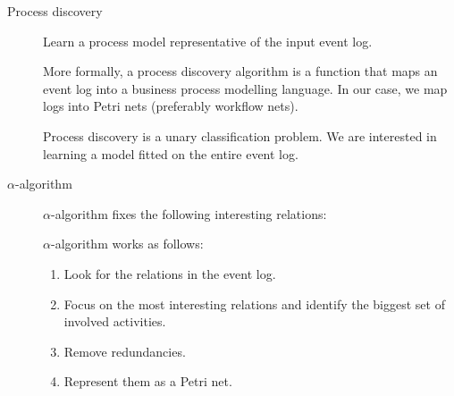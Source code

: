 \begin{description}
    \item[Process discovery] 
        Learn a process model representative of the input event log.

        More formally, a process discovery algorithm is a function that maps an event log into a business process modelling language.
        In our case, we map logs into Petri nets (preferably workflow nets).

        \begin{remark}
            Process discovery is a unary classification problem.
            We are interested in learning a model fitted on the entire event log.
        \end{remark}

    \item[$\alpha$-algorithm] 
        $\alpha$-algorithm fixes the following interesting relations:

        $\alpha$-algorithm works as follows:
        \begin{enumerate}
            \item Look for the relations in the event log.
            \item Focus on the most interesting relations and identify the biggest set of involved activities.
            \item Remove redundancies.
            \item Represent them as a Petri net.
        \end{enumerate}


\end{description}
